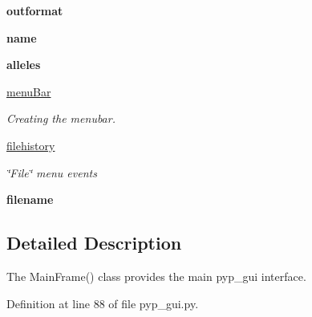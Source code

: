 \begin{DoxyCompactItemize}
\item 
\hypertarget{classPyPedal_1_1pyp__gui_1_1MainWindow_adeb9e607284ad9fb8eeb023a52962858}{
{\bfseries outformat}}
\label{classPyPedal_1_1pyp__gui_1_1MainWindow_adeb9e607284ad9fb8eeb023a52962858}

\item 
\hypertarget{classPyPedal_1_1pyp__gui_1_1MainWindow_a18153ff9d2fe3e85df457b3b85f98d8f}{
{\bfseries name}}
\label{classPyPedal_1_1pyp__gui_1_1MainWindow_a18153ff9d2fe3e85df457b3b85f98d8f}

\item 
\hypertarget{classPyPedal_1_1pyp__gui_1_1MainWindow_af5069aedf4db9fd12e5728ce8b5a4f37}{
{\bfseries alleles}}
\label{classPyPedal_1_1pyp__gui_1_1MainWindow_af5069aedf4db9fd12e5728ce8b5a4f37}

\item 
\hypertarget{classPyPedal_1_1pyp__gui_1_1MainWindow_ae7fbf1c5819f1e6d1f0909b7d9f26e29}{
\hyperlink{classPyPedal_1_1pyp__gui_1_1MainWindow_ae7fbf1c5819f1e6d1f0909b7d9f26e29}{menuBar}}
\label{classPyPedal_1_1pyp__gui_1_1MainWindow_ae7fbf1c5819f1e6d1f0909b7d9f26e29}

\begin{DoxyCompactList}\small\item\em Creating the menubar. \end{DoxyCompactList}\item 
\hyperlink{classPyPedal_1_1pyp__gui_1_1MainWindow_aa6e260ac28d62643a4ad89b5b85920a1}{filehistory}
\begin{DoxyCompactList}\small\item\em \char`\"{}File\char`\"{} menu events \end{DoxyCompactList}\item 
\hypertarget{classPyPedal_1_1pyp__gui_1_1MainWindow_a32300a6ed4306a79d1935f027890f104}{
{\bfseries filename}}
\label{classPyPedal_1_1pyp__gui_1_1MainWindow_a32300a6ed4306a79d1935f027890f104}

\end{DoxyCompactItemize}


\subsection{Detailed Description}
The MainFrame() class provides the main pyp\_\-gui interface. 



Definition at line 88 of file pyp\_\-gui.py.



